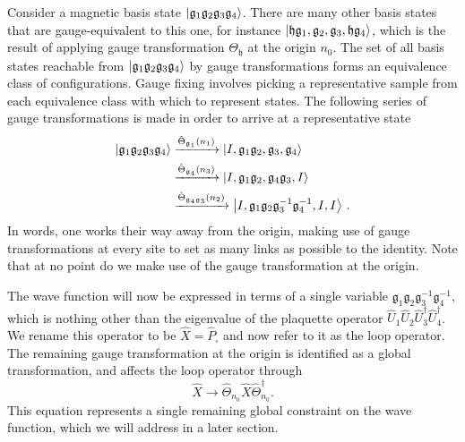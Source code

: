 \documentclass[reprint,superscriptaddress,pra,nofootinbib,preprintnumbers,floatfix]{revtex4-1}
\providecommand{\g}{{\mathfrak{g}}}
\providecommand{\h}{{\mathfrak{h}}}
\begin{document}
Consider a magnetic basis state $\ket{\g_1 \g_2 \g_3 \g_4}$. 
%
There are many other basis states that are gauge-equivalent to this one, for instance $\ket{\h \g_1, \g_2, \g_3, \h\g_4}$, which is the result of applying gauge transformation $\Theta_{\h}$ at the origin $n_0$. 
%
The set of all basis states reachable from $\ket{\g_1 \g_2 \g_3 \g_4}$ by gauge transformations forms an equivalence class of configurations. 
%
Gauge fixing involves picking a representative sample from each equivalence class with which to represent states. 
%
The following series of gauge transformations is made in order to arrive at a representative state
%
\begin{equation}
  \begin{split}
    \ket{\g_1 \g_2 \g_3 \g_4}
      &\xrightarrow{ \hat{\Theta}_{\g_1}(n_1)} \ket{I, \g_1 \g_2, \g_3, \g_4} \\
      &\xrightarrow{ \hat{\Theta}_{\g_4}(n_3)} \ket{I, \g_1 \g_2, \g_4 \g_3 , I} \\
      &\xrightarrow{ \hat{\Theta}_{\g_4 \g_3}(n_2)} \ket{I, \g_1 \g_2 \g_3^{-1} \g_4^{-1}, I, I} \,.
  \end{split}
\end{equation}
%
In words, one works their way away from the origin, making use of gauge transformations at every site to set as many links as possible to the identity. 
%
Note that at no point do we make use of the gauge transformation at the origin. 



The wave function will now be expressed in terms of a single variable $\g_1 \g_2 \g_3^{-1} \g_4^{-1}$, which is nothing other than the eigenvalue of the plaquette operator $\hat{U}_1 \hat{U}_2 \hat{U}^\dagger_3 \hat{U}^\dagger_4$. 
%
We rename this operator to be $\hat{X} = \hat{P}_\square$ and now refer to it as the loop operator. 
%
The remaining gauge transformation at the origin is identified as a global transformation, and affects the loop operator through
%
\begin{equation}
    \hat{X} \to \hat{\Theta}_{n_0} \hat{X} \hat{\Theta}_{n_0}^\dagger. 
\end{equation}
%
This equation represents a single remaining global constraint on the wave function, which we will address in a later section.
\end{document}
